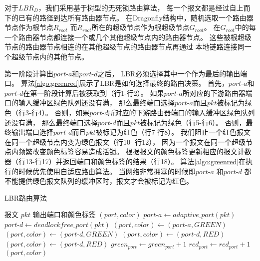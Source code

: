 对于$LBR_D$，我们采用基于树型的无死锁路由算法，
每一个报文都是经过自上而下的已有的路径到达所有路由器节点。
在Dragonfly结构中，随机选取一个路由器节点作为根节点$R_{root}$
而$R_{root}$所在的超级节点作为根超级节点$G_{root}$。
在$G_{root}$中的每一个路由器节点都连接一个或几个其他超级节点内的路由器节点。
这些被根超级节点的路由器节点相连的在其他超级节点的路由器节点再通过
本地链路连接同一个超级节点内的其他节点。

第一阶段计算出$port\textrm{-}a$和$port\textrm{-}d$之后，
LBR必须选择其中一个作为最后的输出端口。
算法\ref{algo:greenred}展示了LBR是如何选择最终的路由决策。
首先，$port\textrm{-}a$和$port\textrm{-}d$在第一阶段计算后被获取到（行1-行2）。
如果$port\textrm{-}a$所对应的下游路由器端口的输入缓冲区绿色队列还没有满，
那么最终端口选择$port\textrm{-}a$而且$pkt$被标记为绿色（行3-行4）。
否则，如果$port\textrm{-}d$所对应的下游路由器端口的输入缓冲区绿色队列还没有满，
那么最终端口选择$port\textrm{-}d$而且$pkt$被标记为绿色（行5-行6）。
否则，最终输出端口选择$port\textrm{-}d$而且$pkt$被标记为红色（行7-行8）。
我们阻止一个红色报文在同一个超级节点内变为绿色报文（行10- 行12），
因为一个报文在同一个超级节点内频繁改变颜色标签容易造成活锁。
根据报文的颜色标签更新相应的报文计数器（行13-行17）并返回端口和颜色标签的结果（行18）。
算法\ref{algo:greenred}在执行的时候优先使用自适应路由算法。
当网络非常拥塞的时候即$port\textrm{-}a$ 和$port\textrm{-}d$
都不能提供绿色报文队列的缓冲区时，报文才会被标记为红色。

\begin{algorithm}[t]
  \centering
  \caption{LBR路由算法}
  \label{algo:greenred}
  \begin{algorithmic}[1]
    \REQUIRE 报文 $pkt$
    \ENSURE 输出端口和颜色标签 $(port, color)$
    \STATE $port\textrm{-}a \leftarrow adaptive\_port(pkt)$
    \STATE $port\textrm{-}d \leftarrow deadlockfree\_port(pkt)$
    \STATE $(port, color) \leftarrow (port\textrm{-}a, GREEN)$
    \STATE $(port, color) \leftarrow (port\textrm{-}d, GREEN)$
    \ELSE
    \STATE $(port, color) \leftarrow (port\textrm{-}d, RED)$
    \ENDIF
    \STATE $(port, color) \leftarrow (port\textrm{-}d, RED)$
    \ENDIF
    \STATE $green_{port} \leftarrow green_{port} + 1$
    \ELSE
    \STATE $red_{port} \leftarrow red_{port} + 1$
    \ENDIF
    \RETURN $(port, color)$
  \end{algorithmic}
\end{algorithm}

